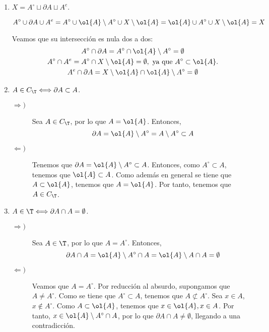 \begin{enumerate}
    
    \item $X=A^\circ \sqcup \partial A \sqcup A^e$.

    \begin{equation*}
        A^\circ \cup \partial A \cup A^e = 
        A^\circ \cup \ol{A}\setminus {A^\circ} \cup X\setminus \ol{A} = \ol{A}\cup A^\circ \cup X\setminus \ol{A} = X
    \end{equation*}

    Veamos que su intersección es nula dos a dos:
    \begin{gather*}
        A^\circ \cap \partial A= 
        A^\circ \cap \ol{A}\setminus {A^\circ} = \emptyset \\
        A^\circ \cap A^e= 
        A^\circ \cap X\setminus \ol{A} = \emptyset,\text{ ya que } A^\circ \subset \ol{A}. \\
        A^e \cap \partial A= 
        X\setminus \ol{A} \cap \ol{A}\setminus {A^\circ} = \emptyset
    \end{gather*}
    
    \item $A\in C_\T\Longleftrightarrow \partial A\subset A$.
    \begin{description}
        \item[$\Longrightarrow)$] Sea $A\in C_\T$, por lo que $A=\ol{A}$. Entonces,
        $$\partial A = \ol{A}\setminus A^\circ = A\setminus A^\circ \subset A$$

        \item[$\Longleftarrow)$] Tenemos que $\partial A=\ol{A}\setminus A^\circ \subset A$. Entonces, como $A^\circ \subset A$, tenemos que $\ol{A}\subset A$. Como además en general se tiene que $A\subset \ol{A}$, tenemos que $A=\ol{A}$. Por tanto, tenemos que $A\in C_\T$.
    \end{description}
    
    \item $A\in \T\Longleftrightarrow \partial A\cap A=\emptyset$.
    \begin{description}
        \item[$\Longrightarrow)$] Sea $A\in \T$, por lo que $A=A^\circ$. Entonces,
        $$\partial A \cap A = \ol{A}\setminus A^\circ \cap A = \ol{A}\setminus A \cap A = \emptyset$$

        \item[$\Longleftarrow)$] Veamos que $A=A^\circ$. Por reducción al absurdo, supongamos que $A\neq A^\circ$. Como se tiene que $A^\circ \subset A$, tenemos que $A\not \subset A^\circ$. Sea $x\in A$, $x\notin A^\circ$. Como $A\subset \ol{A}$, tenemos que $x\in \ol{A},x\in A$. Por tanto, $x\in \ol{A}\setminus A^\circ \cap A$, por lo que $\partial A\cap A\neq \emptyset$, llegando a una contradicción.


\end{description}
\end{enumerate}
